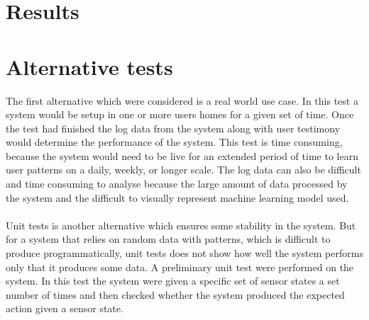 \section{Results}


\section{Alternative tests}
The first alternative which were considered is a real world use case. In this test a system would be setup in one or more users homes for a given set of time. Once the test had finished the log data from the system along with user testimony would determine the performance of the system. This test is time consuming, because the system would need to be live for an extended period of time to learn user patterns on a daily, weekly, or longer scale. The log data can also be difficult and time consuming to analyse because the large amount of data processed by the system and the difficult to visually represent machine learning model used.
\\\\
Unit tests is another alternative which ensures some stability in the system. But for a system that relies on random data with patterns, which is difficult to produce programmatically, unit tests does not show how well the system performs only that it produces some data. A preliminary unit test were performed on the system. In this test the system were given a specific set of sensor states a set number of times and then checked whether the system produced the expected action given a sensor state.
